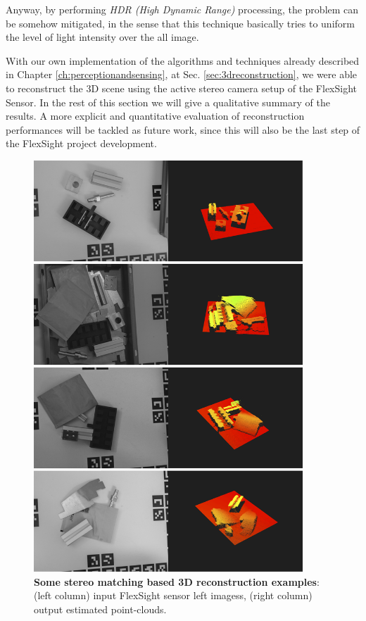 Anyway, by performing \emph{HDR (High Dynamic Range)} processing, the problem can be somehow mitigated, in the sense that this technique basically tries to uniform the level of light intensity over the all image.

With our own implementation of the algorithms and techniques already described in Chapter \ref{ch:perceptionandsensing}, at Sec. \ref{sec:3dreconstruction}, we were able to reconstruct the 3D scene using the active stereo camera setup of the FlexSight Sensor. In the rest of this section we will give a qualitative summary of the results. A more explicit and quantitative evaluation of reconstruction performances will be tackled as future work, since this will also be the last step of the FlexSight project development.

\begin{figure}
    \centering
    \includegraphics[width=0.9\textwidth]{figures/4_experiments/3d_reconst_ex}
    \caption{\textbf{Some stereo matching based 3D reconstruction examples}: (left column) input FlexSight sensor left imagess, (right column) output estimated point-clouds.}
    \label{fig:3d_reconst_ex}
\end{figure}

